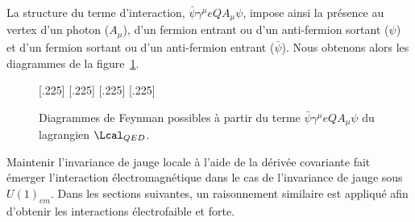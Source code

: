 La structure du terme d'interaction, $\bar{\psi}\gamma^\mu eQA_\mu \psi$, impose ainsi la présence au vertex d'un photon ($A_\mu$), d'un fermion entrant ou d'un anti-fermion sortant ($\psi$) et d'un fermion sortant ou d'un anti-fermion entrant ($\bar{\psi}$). Nous obtenons alors les diagrammes de la figure~\ref{fig-fgraph-ff_Gamma}.
\begin{figure}[h]
\centering
\vspace{\baselineskip}
[.225\textwidth]
{\vspace{\baselineskip}}
\hfill
{}[.225\textwidth]
{\vspace{\baselineskip}}
\hfill
{}[.225\textwidth]
{\vspace{\baselineskip}}
\hfill
{}[.225\textwidth]
{\vspace{\baselineskip}}

\caption{Diagrammes de Feynman possibles à partir du terme $\bar{\psi}\gamma^\mu eQA_\mu \psi$ du lagrangien $\Lcal_{QED}$.}
\label{fig-fgraph-ff_Gamma}
\end{figure}


\par Maintenir l'invariance de jauge locale à l'aide de la dérivée covariante fait émerger l'interaction électromagnétique dans le cas de l'invariance de jauge sous $U(1)_{em}$.  Dans les sections suivantes, un raisonnement similaire est appliqué afin d'obtenir les interactions électrofaible et forte.